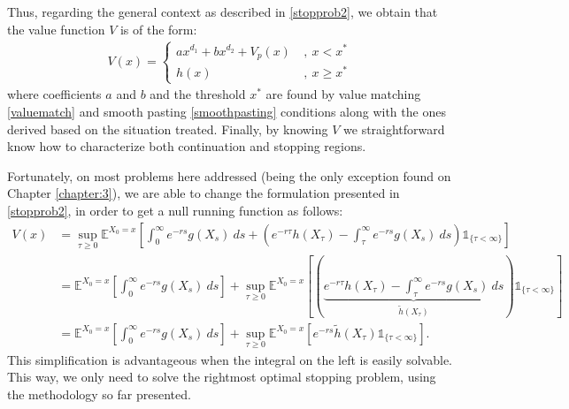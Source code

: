 Thus, regarding the general context as described in \eqref{stopprob2}, we obtain that the value function $V$ is of the form:
\begin{align}
V(x)=\begin{cases}
ax^{d_1}+bx^{d_2}+V_p(x) \ &, \ x<x^*\\
h(x) \ &, \ x\geq x^*
\end{cases}
\label{sol}
\end{align}
where coefficients $a$ and $b$ and the threshold $x^*$ are found by value matching \eqref{valuematch} and smooth pasting \eqref{smoothpasting} conditions along with the ones derived based on the situation treated. Finally, by knowing $V$ we straightforward know how to characterize both continuation and stopping regions.



Fortunately, on most problems here addressed (being the only exception found on Chapter \ref{chapter:3}), we are able to change the formulation presented in \eqref{stopprob2}, in order to get a null running function as follows:
\begin{align}
V(x)&=\sup_{\tau \geq 0} \mathds{E}^{X_0=x}\left[  \int^\infty_0 e^{-r s} g(X_s) \ ds +\left( e^{-r \tau}h(X_\tau)  -   \int_\tau^\infty e^{-r s} g(X_s) \ ds \right) \mathds{1}_{ \{\tau< \infty \}} \right] \nonumber \\
& = \mathds{E}^{X_0=x}\left[ \int^\infty_0 e^{-r s} g(X_s) \ ds \right] + \sup_{\tau \geq 0} \mathds{E}^{X_0=x}\left[ \left( \underbrace{  e^{-r \tau}h(X_\tau) - \int_\tau^\infty e^{-r s} g(X_s) \ ds}_{\widetilde{h}(X_\tau)} \right) \mathds{1}_{ \{\tau< \infty \}} \right] \nonumber \\
& =  \mathds{E}^{X_0=x}\left[ \int^\infty_0 e^{-r s} g(X_s) \ ds \right]+ \sup_{\tau \geq 0}\mathds{E}^{X_0=x}\left[ e^{-r s}\widetilde{h}(X_\tau) \mathds{1}_{ \{\tau< \infty \}} \right] \label{bc_confuso}.
\end{align}
This simplification is advantageous when the integral on the left is easily solvable. This way, we only need to solve the rightmost optimal stopping problem, using the methodology so far presented.









